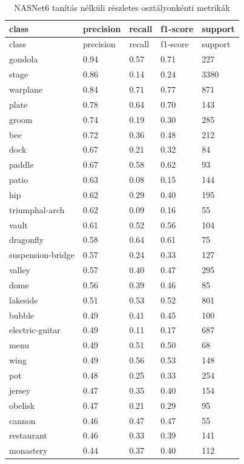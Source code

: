 \begin{center}
\begin{longtable}{lllll}
\caption{NASNet6 tanítás nélküli részletes osztályonkénti metrikák}\label{tab:phase1_NASNet_class_table}\\
\toprule
class & precision & recall & f1-score & support \\
\midrule
\endfirsthead
\toprule
class & precision & recall & f1-score & support \\
\midrule
\endhead
gondola & 0.94 & 0.57 & 0.71 & 227 \\
stage & 0.86 & 0.14 & 0.24 & 3380 \\
warplane & 0.84 & 0.71 & 0.77 & 871 \\
plate & 0.78 & 0.64 & 0.70 & 143 \\
groom & 0.74 & 0.19 & 0.30 & 285 \\
bee & 0.72 & 0.36 & 0.48 & 212 \\
dock & 0.67 & 0.21 & 0.32 & 84 \\
paddle & 0.67 & 0.58 & 0.62 & 93 \\
patio & 0.63 & 0.08 & 0.15 & 144 \\
hip & 0.62 & 0.29 & 0.40 & 195 \\
triumphal-arch & 0.62 & 0.09 & 0.16 & 55 \\
vault & 0.61 & 0.52 & 0.56 & 104 \\
dragonfly & 0.58 & 0.64 & 0.61 & 75 \\
suspension-bridge & 0.57 & 0.24 & 0.33 & 127 \\
valley & 0.57 & 0.40 & 0.47 & 295 \\
dome & 0.56 & 0.39 & 0.46 & 85 \\
lakeside & 0.51 & 0.53 & 0.52 & 801 \\
bubble & 0.49 & 0.41 & 0.45 & 100 \\
electric-guitar & 0.49 & 0.11 & 0.17 & 687 \\
menu & 0.49 & 0.51 & 0.50 & 68 \\
wing & 0.49 & 0.56 & 0.53 & 148 \\
pot & 0.48 & 0.25 & 0.33 & 254 \\
jersey & 0.47 & 0.35 & 0.40 & 154 \\
obelisk & 0.47 & 0.21 & 0.29 & 95 \\
cannon & 0.46 & 0.47 & 0.47 & 55 \\
restaurant & 0.46 & 0.33 & 0.39 & 141 \\
monastery & 0.44 & 0.37 & 0.40 & 112 \\

\end{longtable}
\end{center}
